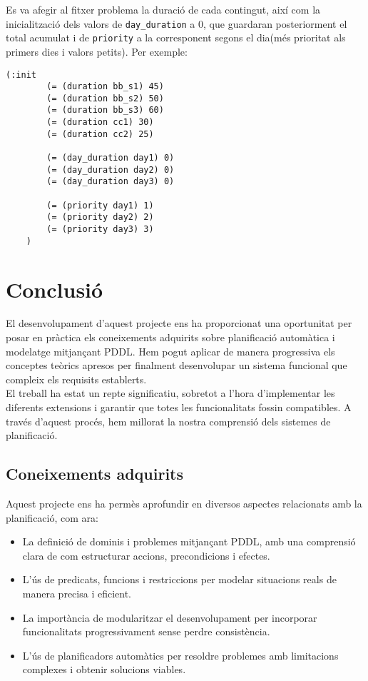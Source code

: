 \documentclass[a4paper]{article}
\begin{document}
	Es va afegir al fitxer problema la duració de cada contingut, així com la inicialització dels valors de \texttt{day\_duration} a 0, que guardaran posteriorment el total acumulat i de \texttt{priority} a la corresponent segons el dia(més prioritat als primers dies i valors petits). Per exemple:
	\begin{lstlisting}[language=PDDL, caption={Novetats en la inicialització per l'extensió 4}, label={lst:iniExtensio4}]
	(:init
		(= (duration bb_s1) 45)
		(= (duration bb_s2) 50)
		(= (duration bb_s3) 60)
		(= (duration cc1) 30)
		(= (duration cc2) 25)
		
		(= (day_duration day1) 0)
		(= (day_duration day2) 0)
		(= (day_duration day3) 0)

		(= (priority day1) 1)
		(= (priority day2) 2)
		(= (priority day3) 3)
	)
	\end{lstlisting}

	
	\newpage
	\section{Conclusió}
	
	El desenvolupament d'aquest projecte ens ha proporcionat una oportunitat per posar en pràctica els coneixements adquirits sobre planificació automàtica i modelatge mitjançant PDDL. Hem pogut aplicar de manera progressiva els conceptes teòrics apresos per finalment desenvolupar un sistema funcional que compleix els requisits establerts.\\ 
	
	El treball ha estat un repte significatiu, sobretot a l'hora d'implementar les diferents extensions i garantir que totes les funcionalitats fossin compatibles. A través d'aquest procés, hem millorat la nostra comprensió dels sistemes de planificació.
	
	
	
	\subsection{Coneixements adquirits}
	
	Aquest projecte ens ha permès aprofundir en diversos aspectes relacionats amb la planificació, com ara:
	\begin{itemize}
		\item La definició de dominis i problemes mitjançant PDDL, amb una comprensió clara de com estructurar accions, precondicions i efectes.
		\item L'ús de predicats, funcions i restriccions per modelar situacions reals de manera precisa i eficient.
		\item La importància de modularitzar el desenvolupament per incorporar funcionalitats progressivament sense perdre consistència.
		\item L'ús de planificadors automàtics per resoldre problemes amb limitacions complexes i obtenir solucions viables.
	\end{itemize}
	
\end{document}
